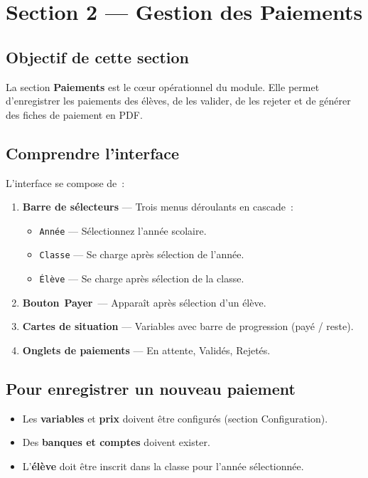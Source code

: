 \documentclass[12pt,a4paper]{report}
\newcommand{\bouton}[1]{{\colorbox{emerald}{\small\sffamily\bfseries\color{white}\,#1\,}}}
\newcommand{\champ}[1]{\texttt{\color{violet}#1}}
\begin{document}
\chapter{Section 2 --- Gestion des Paiements}

\section{Objectif de cette section}

La section \textbf{Paiements} est le c\oe ur op\'erationnel du module. Elle permet d'enregistrer les paiements des \'el\`eves, de les valider, de les rejeter et de g\'en\'erer des fiches de paiement en PDF.

\section{Comprendre l'interface}

L'interface se compose de~:

\begin{enumerate}[leftmargin=1.2cm]
  \item \textbf{Barre de s\'electeurs} --- Trois menus d\'eroulants en cascade~:
  \begin{itemize}
    \item \champ{Ann\'ee} --- S\'electionnez l'ann\'ee scolaire.
    \item \champ{Classe} --- Se charge apr\`es s\'election de l'ann\'ee.
    \item \champ{\'El\`eve} --- Se charge apr\`es s\'election de la classe.
  \end{itemize}
  \item \textbf{Bouton} \bouton{Payer} --- Appara\^it apr\`es s\'election d'un \'el\`eve.
  \item \textbf{Cartes de situation} --- Variables avec barre de progression (pay\'e / reste).
  \item \textbf{Onglets de paiements} --- En attente, Valid\'es, Rejet\'es.
\end{enumerate}

\section{Pour enregistrer un nouveau paiement}

\begin{prerequis}
\begin{itemize}
  \item Les \textbf{variables} et \textbf{prix} doivent \^etre configur\'es (section Configuration).
  \item Des \textbf{banques et comptes} doivent exister.
  \item L'\textbf{\'el\`eve} doit \^etre inscrit dans la classe pour l'ann\'ee s\'electionn\'ee.
\end{itemize}
\end{prerequis}
\end{document}
